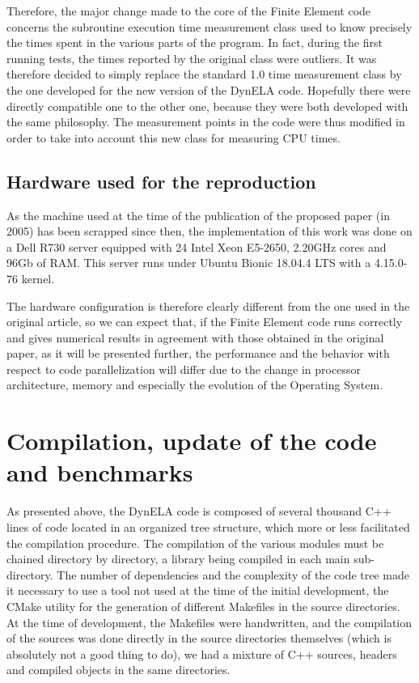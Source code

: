 Therefore, the major change made to the core of the Finite Element code concerns the subroutine execution time measurement class used to know precisely the times spent in the various parts of the program. In fact, during the first running tests, the times reported by the original class were outliers. It was therefore decided to simply replace the standard 1.0 time measurement class by the one developed for the new version of the DynELA code. Hopefully there were directly compatible one to the other one, because they were both developed with the same philosophy. The measurement points in the code were thus modified in order to take into account this new class for measuring CPU times.

\subsection{Hardware used for the reproduction}

As the machine used at the time of the publication of the proposed paper (in 2005) has been scrapped since then, the implementation of this work was done on a Dell R730 server equipped with 24 Intel Xeon E5-2650, 2.20GHz cores and 96Gb of RAM. This server runs under Ubuntu Bionic 18.04.4 LTS with a 4.15.0-76 kernel. 

The hardware configuration is therefore clearly different from the one used in the original article, so we can expect that, if the Finite Element code runs correctly and gives numerical results in agreement with those obtained in the original paper, as it will be presented further, the performance and the behavior with respect to code parallelization will differ due to the change in processor architecture, memory and especially the evolution of the Operating System.

\section{Compilation, update of the code and benchmarks}

As presented above, the DynELA code is composed of several thousand C++ lines of code located in an organized tree structure, which more or less facilitated the compilation procedure. The compilation of the various modules must be chained directory by directory, a library being compiled in each main sub-directory. The number of dependencies and the complexity of the code tree made it necessary to use a tool not used at the time of the initial development, the CMake \cite{CMake} utility for the generation of different Makefiles in the source directories. At the time of development, the Makefiles were handwritten, and the compilation of the sources was done directly in the source directories themselves (which is absolutely not a good thing to do), we had a mixture of C++ sources, headers and compiled objects in the same directories.

